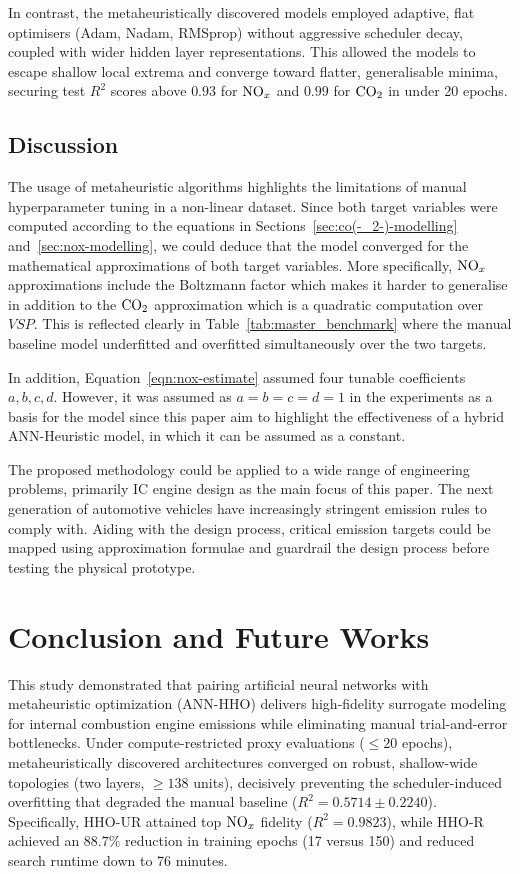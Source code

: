 \documentclass[runningheads]{llncs}
\begin{document}
In contrast, the metaheuristically discovered models employed adaptive, flat optimisers (Adam,
Nadam, RMSprop) without aggressive scheduler decay, coupled with wider hidden layer
representations. This allowed the models to escape shallow local extrema and converge toward
flatter, generalisable minima, securing test $R^2$ scores above $0.93$ for $\ce{NO_x}$ and $0.99$
for $\ce{CO2}$ in under 20 epochs.

\subsection{Discussion}

The usage of metaheuristic algorithms highlights the limitations of manual hyperparameter tuning in
a non-linear dataset. Since both target variables were computed according to the equations in
Sections~\ref{sec:co(-_2-)-modelling} and~\ref{sec:nox-modelling}, we could deduce that the model
converged for the mathematical approximations of both target variables. More specifically,
$\ce{NO_x}$ approximations include the Boltzmann factor which makes it harder to generalise in
addition to the $\ce{CO2}$ approximation which is a quadratic computation over $VSP$. This is
reflected clearly in Table~\ref{tab:master_benchmark} where the manual baseline model underfitted
and overfitted simultaneously over the two targets.

In addition, Equation~\ref{eqn:nox-estimate} assumed four tunable coefficients $a,b,c,d$. However, it
was assumed as $a=b=c=d=1$ in the experiments as a basis for the model since this paper aim to
highlight the effectiveness of a hybrid ANN-Heuristic model, in which it can be assumed as a
constant.

The proposed methodology could be applied to a wide range of engineering problems, primarily IC
engine design as the main focus of this paper. The next generation of automotive vehicles have
increasingly stringent emission rules to comply with. Aiding with the design process, critical
emission targets could be mapped using approximation formulae and guardrail the design process
before testing the physical prototype.

\section{Conclusion and Future Works}

This study demonstrated that pairing artificial neural networks with metaheuristic optimization
(ANN-HHO) delivers high-fidelity surrogate modeling for internal combustion engine emissions while
eliminating manual trial-and-error bottlenecks. Under compute-restricted proxy evaluations ($\le 20$
epochs), metaheuristically discovered architectures converged on robust, shallow-wide topologies (two
layers, $\ge 138$ units), decisively preventing the scheduler-induced overfitting that degraded the
manual baseline ($R^2 = 0.5714 \pm 0.2240$). Specifically, HHO-UR attained top $\ce{NO_x}$ fidelity
($R^2 = 0.9823$), while HHO-R achieved an $88.7\%$ reduction in training epochs (17 versus 150) and
reduced search runtime down to 76 minutes.
\end{document}
